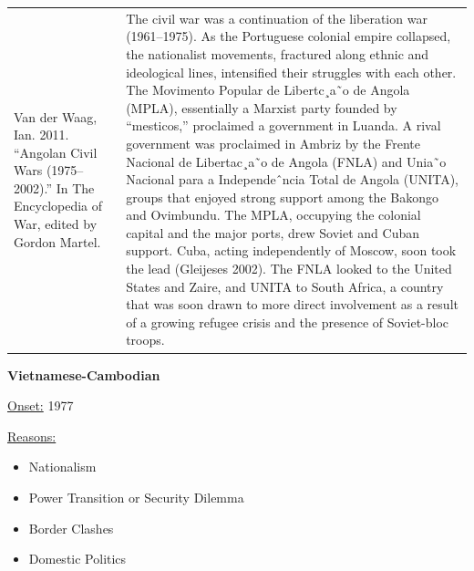 {\begin{longtable}{p{}p{}}
\\
Van der Waag, Ian. 2011. “Angolan Civil Wars (1975–2002).” In The Encyclopedia of War, edited by Gordon Martel. & The civil war was a continuation of the liberation war (1961–1975). As the Portuguese colonial empire collapsed, the nationalist movements, fractured along ethnic and ideological lines, intensified their struggles with each other. The Movimento Popular de Libertc¸a˜o de Angola (MPLA), essentially a Marxist party founded by “mesticos,” proclaimed a government in Luanda. A rival government was proclaimed in Ambriz by the Frente Nacional de Libertac¸a˜o de Angola (FNLA) and Unia˜o Nacional para a Independeˆncia Total de Angola (UNITA), groups that enjoyed strong support among the Bakongo and Ovimbundu. The MPLA, occupying the colonial capital and the major ports, drew Soviet and Cuban support. Cuba, acting independently of Moscow, soon took the lead (Gleijeses 2002). The FNLA looked to the United States and Zaire, and UNITA to South Africa, a country that was soon drawn to more direct involvement as a result of a growing refugee crisis and the presence of Soviet-bloc troops.
\\
\end{longtable}}
\clearpage
         \textbf{Vietnamese-Cambodian} 

          \underline{Onset:} 1977         

\underline{Reasons:}
\begin{itemize}
\item Nationalism
\item Power Transition or Security Dilemma
\item Border Clashes
\item Domestic Politics
\end{itemize}

